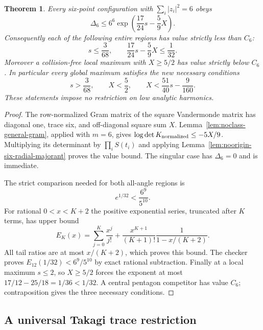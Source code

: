 \documentclass[11pt]{article}
\newtheorem{theorem}{Theorem}[section]
\theoremstyle{remark}
\numberwithin{equation}{section}
\begin{document}
\begin{theorem}\label{thm:noorigin-six-whole-regions}
Every six-point configuration with $\sum_i|z_i|^2=6$ obeys
\begin{equation}\label{eq:noorigin-six-all-angle-value}
 \Delta_6\le6^6\exp\left(\frac{17}{24}s-\frac59X\right).
\end{equation}
Consequently each of the following entire regions has value
strictly less than $C_6$:
\[
 s\le\frac3{68},\qquad
 \frac{17}{24}s-\frac59X\le\frac1{32}.
\]
Moreover a collision-free local maximum with $X\ge5/2$ has
value strictly below $C_6$. In particular every global maximum
satisfies the new necessary conditions
\[
 s>\frac3{68},\qquad X<\frac52,\qquad
 X<\frac{51}{40}s-\frac9{160}.
\]
These statements impose no restriction on low analytic harmonics.
\end{theorem}
\begin{proof}
The row-normalized Gram matrix of the square Vandermonde matrix
has diagonal one, trace six, and off-diagonal square sum $X$.
Lemma~\ref{lem:noclass-general-gram}, applied with $m=6$, gives
$\log\det K_{\rm normalized}\le-5X/9$.
Multiplying its determinant by $\prod_iS(t_i)$ and applying
Lemma~\ref{lem:noorigin-six-radial-majorant} proves the value bound.
The singular case has $\Delta_6=0$ and is immediate.

The strict comparison needed for both all-angle regions is
\[
                   e^{1/32}<\frac{6^9}{5^{10}}.
\]
For rational $0<x<K+2$ the positive exponential series, truncated after
$K$ terms, has upper bound
\[
 E_K(x)=\sum_{j=0}^K\frac{x^j}{j!}
       +\frac{x^{K+1}}{(K+1)!}\frac1{1-x/(K+2)}.
\]
All tail ratios are at most $x/(K+2)$, which proves this bound.
The checker proves $E_{12}(1/32)<6^9/5^{10}$ by exact rational
subtraction. Finally at a local maximum $s\le2$, so $X\ge5/2$
forces the exponent at most $17/12-25/18=1/36<1/32$.
A central pentagon competitor has value $C_6$; contraposition
gives the three necessary conditions.
\end{proof}

\subsection{A universal Takagi trace restriction}
\end{document}
